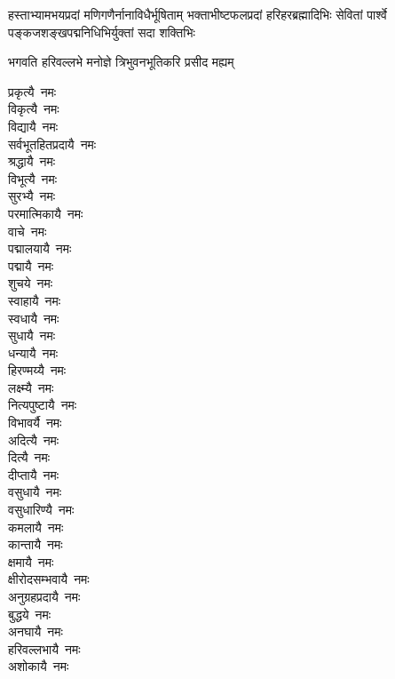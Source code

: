 
{हस्ताभ्यामभयप्रदां मणिगणैर्नानाविधैर्भूषिताम्}
{भक्ताभीष्टफलप्रदां हरिहरब्रह्मादिभिः सेवितां}
{पार्श्वे पङ्कजशङ्खपद्मनिधिभिर्युक्तां सदा शक्तिभिः}

{भगवति हरिवल्लभे मनोज्ञे त्रिभुवनभूतिकरि प्रसीद मह्यम्}


\begin{multicols}{2}
\begin{flushleft}
प्रकृत्यै~नमः\\
विकृत्यै~नमः\\
विद्यायै~नमः\\
सर्वभूतहितप्रदायै~नमः\\
श्रद्धायै~नमः\\
विभूत्यै~नमः\\
सुरभ्यै~नमः\\
परमात्मिकायै~नमः\\
वाचे~नमः\\
पद्मालयायै~नमः\hfill{}\\
पद्मायै~नमः\\
शुचये~नमः\\
स्वाहायै~नमः\\
स्वधायै~नमः\\
सुधायै~नमः\\
धन्यायै~नमः\\
हिरण्मय्यै~नमः\\
लक्ष्म्यै~नमः\\
नित्यपुष्टायै~नमः\\
विभावर्यै~नमः\hfill{}\\
अदित्यै~नमः\\
दित्यै~नमः\\
दीप्तायै~नमः\\
वसुधायै~नमः\\
वसुधारिण्यै~नमः\\
कमलायै~नमः\\
कान्तायै~नमः\\
क्षमायै~नमः\\
क्षीरोदसम्भवायै~नमः\\
अनुग्रहप्रदायै~नमः\hfill{}\\
बुद्धये~नमः\\
अनघायै~नमः\\
हरिवल्लभायै~नमः\\
अशोकायै~नमः\\

\end{flushleft}
\end{multicols}

